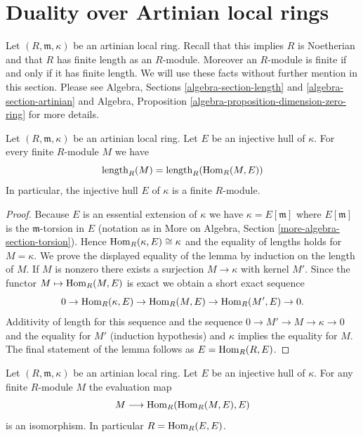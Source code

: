 \section{Duality over Artinian local rings}
\label{section-artinian}

\noindent
Let $(R, \mathfrak m, \kappa)$ be an artinian local ring.
Recall that this implies $R$ is Noetherian and that $R$ has finite
length as an $R$-module. Moreover an $R$-module is finite if and
only if it has finite length. We will use these facts without
further mention in this section. Please see
Algebra, Sections \ref{algebra-section-length} and
\ref{algebra-section-artinian}
and
Algebra, Proposition \ref{algebra-proposition-dimension-zero-ring}
for more details.

\begin{lemma}
\label{lemma-finite}
Let $(R, \mathfrak m, \kappa)$ be an artinian local ring.
Let $E$ be an injective hull of $\kappa$. For every finite
$R$-module $M$ we have
$$
\text{length}_R(M) = \text{length}_R(\mathop{\mathrm{Hom}}\nolimits_R(M, E))
$$
In particular, the injective hull $E$ of $\kappa$ is a finite $R$-module.
\end{lemma}

\begin{proof}
Because $E$ is an essential extension of $\kappa$ we have
$\kappa = E[\mathfrak m]$ where $E[\mathfrak m]$ is the
$\mathfrak m$-torsion in $E$ (notation as in More on Algebra, Section
\ref{more-algebra-section-torsion}).
Hence $\mathop{\mathrm{Hom}}\nolimits_R(\kappa, E) \cong \kappa$ and the equality of lengths
holds for $M = \kappa$. We prove the displayed equality of the lemma
by induction on the length of $M$. If $M$ is nonzero there exists a surjection
$M \to \kappa$ with kernel $M'$. Since the functor $M \mapsto \mathop{\mathrm{Hom}}\nolimits_R(M, E)$
is exact we obtain a short exact sequence
$$
0 \to \mathop{\mathrm{Hom}}\nolimits_R(\kappa, E) \to \mathop{\mathrm{Hom}}\nolimits_R(M, E) \to \mathop{\mathrm{Hom}}\nolimits_R(M', E) \to 0.
$$
Additivity of length for this sequence and the sequence
$0 \to M' \to M \to \kappa \to 0$ and the equality for $M'$ (induction
hypothesis) and $\kappa$ implies the equality for $M$.
The final statement of the lemma follows as $E = \mathop{\mathrm{Hom}}\nolimits_R(R, E)$.
\end{proof}

\begin{lemma}
\label{lemma-evaluate}
Let $(R, \mathfrak m, \kappa)$ be an artinian local ring.
Let $E$ be an injective hull of $\kappa$.
For any finite $R$-module $M$ the evaluation map
$$
M \longrightarrow \mathop{\mathrm{Hom}}\nolimits_R(\mathop{\mathrm{Hom}}\nolimits_R(M, E), E)
$$
is an isomorphism. In particular $R = \mathop{\mathrm{Hom}}\nolimits_R(E, E)$.
\end{lemma}

